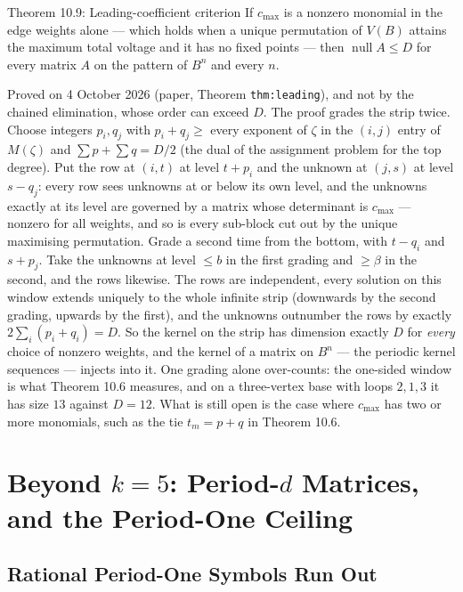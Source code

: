 \documentclass[11pt]{article}
\begin{document}
\begin{thmbox}{Theorem 10.9: Leading-coefficient criterion}
If $c_{\max}$ is a nonzero monomial in the edge weights alone --- which holds when a unique permutation of $V(B)$ attains the maximum total voltage and it has no fixed points --- then $\operatorname{null}A\le D$ for every matrix $A$ on the pattern of $B^n$ and every $n$.
\end{thmbox}

Proved on 4 October 2026 (paper, Theorem \texttt{thm:leading}), and not by the chained elimination, whose order can exceed $D$. The proof grades the strip twice. Choose integers $p_i,q_j$ with $p_i+q_j\ge$ every exponent of $\zeta$ in the $(i,j)$ entry of $M(\zeta)$ and $\sum p+\sum q=D/2$ (the dual of the assignment problem for the top degree). Put the row at $(i,t)$ at level $t+p_i$ and the unknown at $(j,s)$ at level $s-q_j$: every row sees unknowns at or below its own level, and the unknowns exactly at its level are governed by a matrix whose determinant is $c_{\max}$ --- nonzero for all weights, and so is every sub-block cut out by the unique maximising permutation. Grade a second time from the bottom, with $t-q_i$ and $s+p_j$. Take the unknowns at level $\le b$ in the first grading and $\ge\beta$ in the second, and the rows likewise. The rows are independent, every solution on this window extends uniquely to the whole infinite strip (downwards by the second grading, upwards by the first), and the unknowns outnumber the rows by exactly $2\sum_i(p_i+q_i)=D$. So the kernel on the strip has dimension exactly $D$ for \emph{every} choice of nonzero weights, and the kernel of a matrix on $B^n$ --- the periodic kernel sequences --- injects into it. One grading alone over-counts: the one-sided window is what Theorem 10.6 measures, and on a three-vertex base with loops $2,1,3$ it has size $13$ against $D=12$. What is still open is the case where $c_{\max}$ has two or more monomials, such as the tie $t_m=p+q$ in Theorem 10.6.

\newpage
\section{Beyond $k=5$: Period-$d$ Matrices, and the Period-One Ceiling}

\subsection{Rational Period-One Symbols Run Out}
\end{document}
